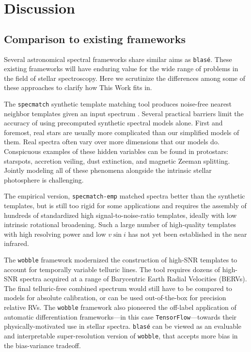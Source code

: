 \documentclass[modern]{aastex631}
\begin{document}

\section{Discussion}\label{secDiscuss}

\subsection{Comparison to existing frameworks}

Several astronomical spectral frameworks share similar aims as \texttt{blas\'e}.  These existing frameworks will have enduring value for the wide range of problems in the field of stellar spectroscopy.  Here we scrutinize the differences among some of these approaches to clarify how This Work fits in.

The \texttt{specmatch} synthetic template matching tool produces noise-free nearest neighbor templates given an input spectrum \citep{2015PhDT........82P}.  Several practical barriers limit the accuracy of using precomputed synthetic spectral models alone. First and foremost, real stars are usually more complicated than our simplified models of them. Real spectra often vary over more dimensions that our models do.  Conspicuous examples of these hidden variables can be found in protostars: starspots, accretion veiling, dust extinction, and magnetic Zeeman splitting. Jointly modeling all of these phenomena alongside the intrinsic stellar photosphere is challenging.

The empirical version, \texttt{specmatch-emp} \citep{2017ApJ...836...77Y} matched spectra better than the synthetic templates, but is still too rigid for some applications and requires the assembly of hundreds of standardized high signal-to-noise-ratio templates, ideally with low intrinsic rotational broadening.  Such a large number of high-quality templates with high resolving power and low $v\sin{i}$ has not yet been established in the near infrared.

The \texttt{wobble} framework \citep{2019AJ....158..164B} modernized the construction of high-SNR templates to account for temporally variable telluric lines. The tool requires dozens of high-SNR spectra acquired at a range of Barycentric Earth Radial Velocities (BERVs).  The final telluric-free combined spectrum would still have to be compared to models for absolute calibration, or can be used out-of-the-box for precision relative RVs.  The \texttt{wobble} framework also pioneered the off-label application of automatic differentiation frameworks---in this case \texttt{TensorFlow}---towards their physically-motivated use in stellar spectra.  \texttt{blas\'e} can be viewed as an evaluable and interpretable super-resolution version of \texttt{wobble}, that accepts more bias in the bias-variance tradeoff.
\end{document}
